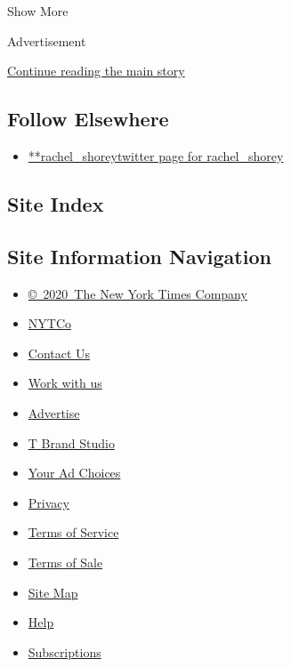 Show More

Advertisement

\protect\hyperlink{after-mid2}{Continue reading the main story}

\hypertarget{follow-elsewhere}{%
\subsection{Follow Elsewhere}\label{follow-elsewhere}}

\begin{itemize}
\tightlist
\item
  \href{https://twitter.com/rachel_shorey}{**rachel\_shoreytwitter page
  for rachel\_shorey}
\end{itemize}

\hypertarget{site-index}{%
\subsection{Site Index}\label{site-index}}

\hypertarget{site-information-navigation}{%
\subsection{Site Information
Navigation}\label{site-information-navigation}}

\begin{itemize}
\tightlist
\item
  \href{https://help.nytimes.com/hc/en-us/articles/115014792127-Copyright-notice}{©~2020~The
  New York Times Company}
\end{itemize}

\begin{itemize}
\tightlist
\item
  \href{https://www.nytco.com/}{NYTCo}
\item
  \href{https://help.nytimes.com/hc/en-us/articles/115015385887-Contact-Us}{Contact
  Us}
\item
  \href{https://www.nytco.com/careers/}{Work with us}
\item
  \href{https://nytmediakit.com/}{Advertise}
\item
  \href{http://www.tbrandstudio.com/}{T Brand Studio}
\item
  \href{https://www.nytimes.com/privacy/cookie-policy\#how-do-i-manage-trackers}{Your
  Ad Choices}
\item
  \href{https://www.nytimes.com/privacy}{Privacy}
\item
  \href{https://help.nytimes.com/hc/en-us/articles/115014893428-Terms-of-service}{Terms
  of Service}
\item
  \href{https://help.nytimes.com/hc/en-us/articles/115014893968-Terms-of-sale}{Terms
  of Sale}
\item
  \href{https://spiderbites.nytimes.com}{Site Map}
\item
  \href{https://help.nytimes.com/hc/en-us}{Help}
\item
  \href{https://www.nytimes.com/subscription?campaignId=37WXW}{Subscriptions}
\end{itemize}
